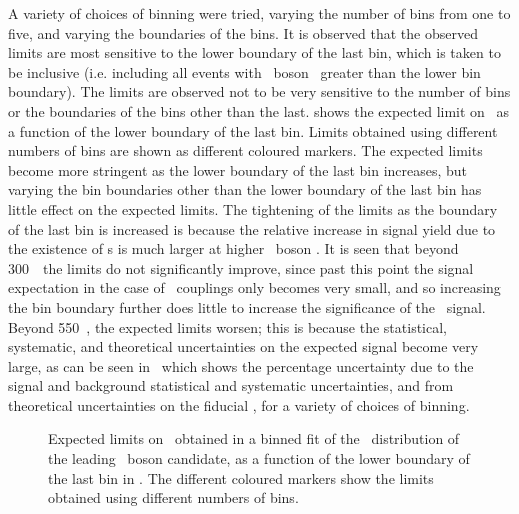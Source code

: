 A variety of choices of binning were tried, varying the number of bins from one
to five, and varying the boundaries of the bins. It is observed that the
observed limits are most sensitive to the lower boundary of the last bin, which
is taken to be inclusive (i.e. including all events with \Z\ boson \pt\ greater
than the lower bin boundary). The limits are observed not to be very sensitive
to the number of bins or the boundaries of the bins other than the last.
 shows the expected limit on \ffourg\ as a function of the lower
boundary of the last bin. Limits obtained using different numbers of bins are
shown as different coloured markers. The expected limits become more stringent
as the lower boundary of the last bin increases, but varying the bin boundaries
other than the lower boundary of the last bin has little effect on the expected
limits.  The tightening of the limits as the boundary of the last bin is
increased is because the relative increase in signal yield due to the existence
of \TGC s is much larger at higher \Z\ boson \pt. It is seen that beyond
300~\gev\ the limits do not significantly improve, since past this point the
signal expectation in the case of \sm\ couplings only becomes very small, and so
increasing the bin boundary further does little to increase the significance of
the \TGC\ signal. Beyond 550~\gev, the expected limits worsen; this is because
the statistical, systematic, and theoretical uncertainties on the expected
signal become very large, as can be seen in~ which shows
the percentage uncertainty due to the signal and background statistical and
systematic uncertainties, and from theoretical uncertainties on the fiducial
\cx, for a variety of choices of binning.

\begin{figure}[htbp]
\begin{center}
\caption{
\small
Expected limits on \ffourg\ obtained in a binned fit of the \pt\ distribution of
the leading \Z\ boson candidate, as a function of the lower boundary of the last bin
in \pt. The different coloured markers show the limits obtained using 
different numbers of bins.
 }
\label{fig:TGC-binOpt}
\end{center}
\end{figure}

